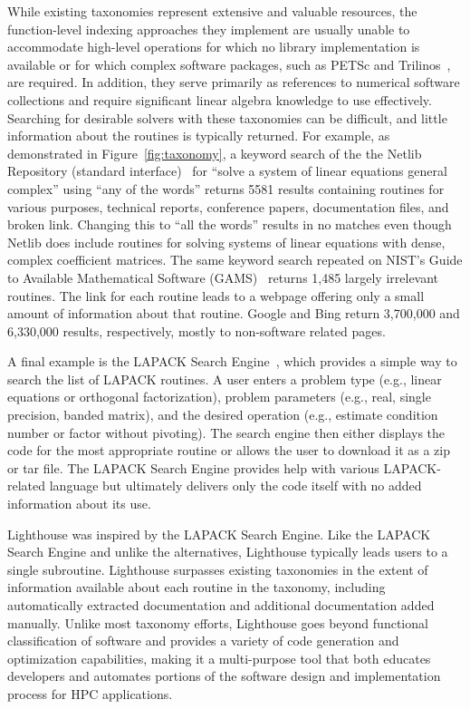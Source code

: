 \documentclass{sig-alternate}
\begin{document}
While existing taxonomies represent extensive and valuable resources, the function-level indexing approaches they implement are
usually unable to accommodate high-level operations for which no library implementation is available or for which complex software packages,
such as PETSc and Trilinos~\cite{trilinos:Online}, are required.
In addition, they serve primarily as references to numerical software collections and require significant linear algebra knowledge to
use effectively. Searching for desirable solvers with these taxonomies can be difficult, and little information about the routines is typically
returned. For example, as demonstrated in Figure~\ref{fig:taxonomy}, a keyword search 
of the the Netlib Repository (standard interface)~\cite{netlib:Online} for
``solve a system of linear equations general complex'' using
``any of the words'' returns 
5581 results containing routines for various purposes, technical reports, conference
papers, documentation files, and broken link.  Changing this to
``all the words'' results in no matches even though Netlib does include routines for solving systems of linear
equations with dense, complex coefficient matrices.
The same keyword search repeated on NIST's Guide to Available Mathematical Software
(GAMS)~\cite{GAMS} returns 1,485 largely irrelevant routines.
The link for each routine leads to a webpage offering only a small amount of information about that
routine. Google and Bing return 3,700,000 and 6,330,000 results, respectively, mostly to non-software related pages.

A final example is the LAPACK Search Engine~\cite{LAPACKSearch}, which provides a simple way to search the list of LAPACK
routines. A user enters a problem type (e.g., linear equations or orthogonal factorization), problem parameters (e.g., 
real, single precision, banded matrix), and the desired operation (e.g., estimate condition number or factor without pivoting).
The search engine then either displays the code for the most appropriate routine or allows the user to download it as a zip or tar file.
The LAPACK Search Engine provides help with various LAPACK-related language but ultimately delivers only the code itself with no added
information about its use.  

Lighthouse was inspired by the LAPACK Search Engine. Like the LAPACK Search Engine and unlike the alternatives, Lighthouse typically leads
users to a single subroutine. Lighthouse surpasses existing taxonomies in the extent of information available about each
routine in the taxonomy, including automatically extracted documentation and additional documentation added manually.
Unlike most taxonomy efforts, Lighthouse goes beyond functional classification of software and provides a variety of code generation 
and optimization capabilities, making it a multi-purpose tool that both educates developers and automates portions of the 
software design and implementation process for HPC applications.
\end{document}
